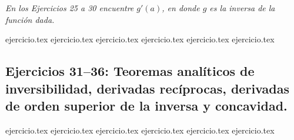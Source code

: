 \noindent \textit{En los Ejercicios 25 a 30 encuentre $g'(a)$, en donde $g$ es la inversa de la función dada.}

\begin{enumerate}
    \setcounter{enumi}{24}
    {ejercicio.tex}
    {ejercicio.tex}
    {ejercicio.tex}
    {ejercicio.tex}
    {ejercicio.tex}
    {ejercicio.tex}
\end{enumerate}

\subsection*{Ejercicios 31--36: Teoremas analíticos de inversibilidad, derivadas recíprocas, derivadas de orden superior de la inversa y concavidad.}

\begin{enumerate}
    \setcounter{enumi}{30}
    {ejercicio.tex}
    {ejercicio.tex}
    {ejercicio.tex}
    {ejercicio.tex}
    {ejercicio.tex}
    {ejercicio.tex}
\end{enumerate}
